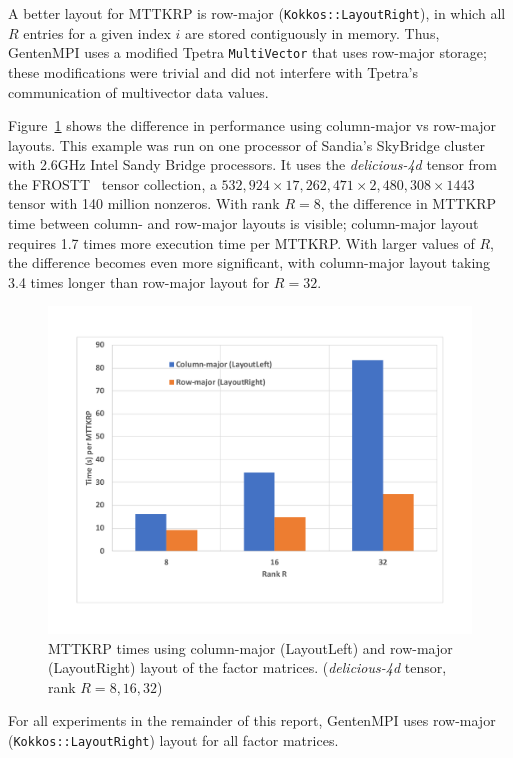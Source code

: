 A better layout for MTTKRP is row-major ({\tt Kokkos::LayoutRight}), in
which all $R$ entries for a given index $i$ are stored contiguously in 
memory.  Thus, GentenMPI uses a modified Tpetra {\tt MultiVector} that 
uses row-major storage; these modifications were trivial and did not interfere
with Tpetra's communication of multivector data values.

Figure~\ref{fig:layouts} shows the difference in performance using 
column-major vs row-major layouts.  This example was run on one processor
of Sandia's SkyBridge cluster with 2.6GHz Intel Sandy Bridge processors.
It uses the \emph{delicious-4d} tensor from the FROSTT~\cite{FROSTT} tensor collection,
a $532,924 \times 17,262,471 \times 2,480,308 \times 1443$ tensor with 140 million
nonzeros.  With rank $R=8$, the difference in MTTKRP time between column-
and row-major layouts is visible; column-major layout requires 1.7 times more
execution time per MTTKRP.  With larger values of
$R$, the difference becomes even more significant, with column-major layout
taking 3.4 times longer than row-major layout for $R=32$.


\begin{figure}[ht]
   \centering
   \includegraphics[keepaspectratio=true, width=4.5in]{figs/layouts}
   \caption[MTTKRP times using column- and row-major layout of factor matrices]{MTTKRP times using column-major (LayoutLeft) and row-major
(LayoutRight) layout of the factor matrices. (\emph{delicious-4d}
tensor, rank $R=8,16,32$)}
   \label{fig:layouts}
\end{figure}

For all experiments in the remainder of this report, GentenMPI uses
row-major (\texttt{Kokkos::LayoutRight}) layout for all factor matrices.
